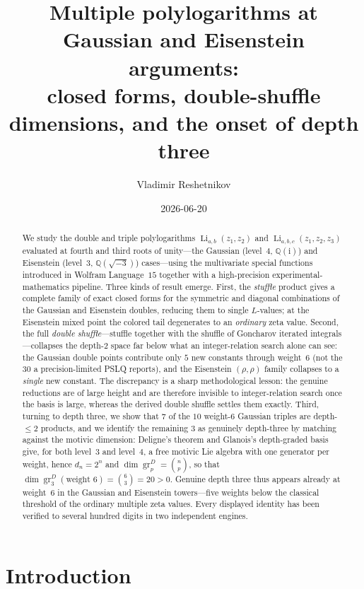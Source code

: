 \documentclass[11pt]{article}
\title{Multiple polylogarithms at Gaussian and Eisenstein arguments:\\
closed forms, double-shuffle dimensions, and the onset of depth three}
\author{Vladimir Reshetnikov}
\date{2026-06-20}
\DeclareMathOperator{\Li}{Li}
\newcommand{\iu}{\mathrm{i}}
\newcommand{\gr}{\operatorname{gr}}
\theoremstyle{plain}
\theoremstyle{remark}
\begin{document}
\maketitle

\begin{abstract}
We study the double and triple polylogarithms $\Li_{a,b}(z_1,z_2)$ and $\Li_{a,b,c}(z_1,z_2,z_3)$
evaluated at fourth and third roots of unity---the Gaussian (level~$4$, $\mathbb{Q}(\iu)$) and
Eisenstein (level~$3$, $\mathbb{Q}(\sqrt{-3})$) cases---using the multivariate special functions
introduced in Wolfram Language~$15$ together with a high-precision experimental-mathematics
pipeline. Three kinds of result emerge. First, the \emph{stuffle} product gives a complete family of
exact closed forms for the symmetric and diagonal combinations of the Gaussian and Eisenstein
doubles, reducing them to single $L$-values; at the Eisenstein mixed point the colored tail
degenerates to an \emph{ordinary} zeta value. Second, the full \emph{double shuffle}---stuffle
together with the shuffle of Goncharov iterated integrals---collapses the depth-$2$ space far below
what an integer-relation search alone can see: the Gaussian double points contribute only $5$ new
constants through weight~$6$ (not the $30$ a precision-limited PSLQ reports), and the Eisenstein
$(\rho,\rho)$ family collapses to a \emph{single} new constant. The discrepancy is a sharp
methodological lesson: the genuine reductions are of large height and are therefore invisible to
integer-relation search once the basis is large, whereas the derived double shuffle settles them
exactly. Third, turning to depth three, we show that $7$ of the $10$ weight-$6$ Gaussian triples are
depth-$\le2$ products, and we identify the remaining $3$ as genuinely depth-three by matching against
the motivic dimension: Deligne's theorem and Glanois's depth-graded basis give, for both level~$3$
and level~$4$, a free motivic Lie algebra with one generator per weight, hence $d_n=2^n$ and
$\dim\gr^D_p=\binom{n}{p}$, so that $\dim\gr^D_3(\text{weight }6)=\binom{6}{3}=20>0$. Genuine depth
three thus appears already at weight~$6$ in the Gaussian and Eisenstein towers---five weights below
the classical threshold of the ordinary multiple zeta values. Every displayed identity has been
verified to several hundred digits in two independent engines.
\end{abstract}

\tableofcontents

\section{Introduction}\label{sec:intro}
\end{document}
